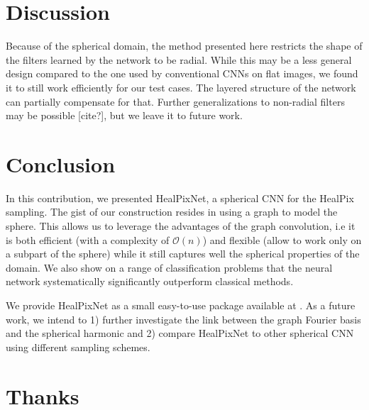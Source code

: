 \documentclass[final,twocolumn,3p,times,authoryear]{elsarticle}
\newcommand{\nati}[1]{{\color[rgb]{.1,.6,.1}{#1}}}
\newcommand{\todo}[1]{{\color[rgb]{.6,.1,.6}{#1}}}
\newcommand{\1}{\b{1}}              %
\newcommand{\0}{\b{0}}              %
\begin{document}
\section{Discussion}

Because of the spherical domain, the method presented here restricts the shape of the filters learned by the network to be radial.
While this may be a less general design compared to the one used by conventional CNNs on flat images, we found it to still work efficiently for our test cases.
The layered structure of the network can partially compensate for that.
Further generalizations to non-radial filters may be possible [cite?], but we leave it to future work.

\nati{Should the discussion be merged with the result section?}

\section{Conclusion}
\label{sec:conclusion}

In this contribution, we presented HealPixNet, a spherical CNN for the HealPix sampling. The gist of our construction resides in using a graph to model the sphere.
This allows us to leverage the advantages of the graph convolution, i.e it is both efficient (with a complexity of $\mathcal{O}(n)$) and flexible (allow to work only on a subpart of the sphere) while it still captures well the spherical properties of the domain.
We also show on a range of classification problems that the neural network systematically significantly outperform classical methods.

We provide HealPixNet as a small easy-to-use package available at \todo{\url{https://github.com/xxx}}.
As a future work, we intend to 1) further investigate the link between the graph Fourier basis and the spherical harmonic and 2) compare HealPixNet to other spherical CNN using different sampling schemes.

\section*{Thanks}

\appendix
\end{document}

